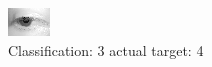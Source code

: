 \begin{figure}[h!]
\begin{center}
\includegraphics[width=0.60\columnwidth]{figures/ID2595_class_3_target_4.png}
\end{center}
\caption{ Classification: 3 actual target: 4}
\label{fig:ID2595_class_3_target_4}
\end{figure}
